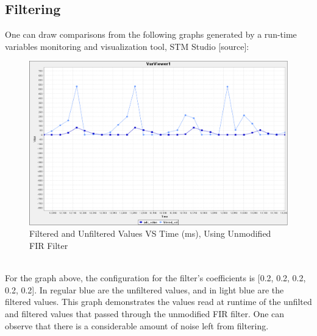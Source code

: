 \documentclass[12pt]{report}
\begin{document}
\subsection{Filtering}\label{testfiltering}
One can draw comparisons from the following graphs generated by a run-time variables monitoring and visualization tool, STM Studio [source]:\\
\begin{figure}[h] %
	\label{Linear Graph of the Filtered and Unfiltered Values Plotted Against Time}
	\begin{center}
		\includegraphics[scale=0.5]{./figures/adc_5coeffs.PNG}
		\caption{Filtered and Unfiltered Values VS Time (ms), Using Unmodified FIR Filter}
	\end{center}
\end{figure}
\\For the graph above, the configuration for the filter's coefficients is [0.2, 0.2, 0.2, 0.2, 0.2]. In regular blue are the unfiltered values, and in light blue are the filtered values. This graph demonstrates the values read at runtime of the unfilted and filtered values that passed through the unmodified FIR filter. One can observe that there is a considerable amount of noise left from filtering.
\end{document}
